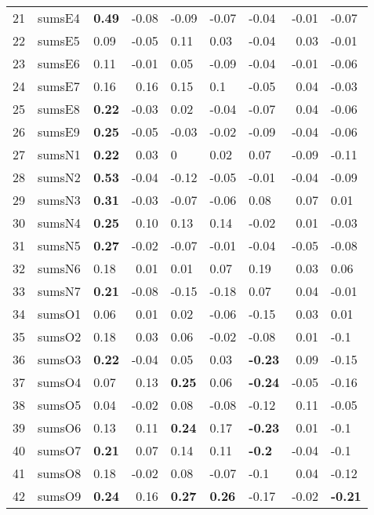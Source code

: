 \documentclass[man]{apa6}
\theoremstyle{definition}
\theoremstyle{definition}
\theoremstyle{definition}
\theoremstyle{remark}
\begin{document}
\begin{table}[ht]
\begin{tabular}{rllrlllrl}
   21 & sumsE4 & \textbf{0.49} & -0.08 & -0.09 & -0.07 & -0.04 & -0.01 & -0.07 \\ 
   22 & sumsE5 & 0.09 & -0.05 & 0.11 & 0.03 & -0.04 & 0.03 & -0.01 \\ 
   23 & sumsE6 & 0.11 & -0.01 & 0.05 & -0.09 & -0.04 & -0.01 & -0.06 \\ 
   24 & sumsE7 & 0.16 & 0.16 & 0.15 & 0.1 & -0.05 & 0.04 & -0.03 \\ 
   25 & sumsE8 & \textbf{0.22} & -0.03 & 0.02 & -0.04 & -0.07 & 0.04 & -0.06 \\ 
   26 & sumsE9 & \textbf{0.25} & -0.05 & -0.03 & -0.02 & -0.09 & -0.04 & -0.06 \\ 
   27 & sumsN1 & \textbf{0.22} & 0.03 & 0 & 0.02 & 0.07 & -0.09 & -0.11 \\ 
   28 & sumsN2 & \textbf{0.53} & -0.04 & -0.12 & -0.05 & -0.01 & -0.04 & -0.09 \\ 
   29 & sumsN3 & \textbf{0.31} & -0.03 & -0.07 & -0.06 & 0.08 & 0.07 & 0.01 \\ 
   30 & sumsN4 & \textbf{0.25} & 0.10 & 0.13 & 0.14 & -0.02 & 0.01 & -0.03 \\ 
   31 & sumsN5 & \textbf{0.27} & -0.02 & -0.07 & -0.01 & -0.04 & -0.05 & -0.08 \\ 
   32 & sumsN6 & 0.18 & 0.01 & 0.01 & 0.07 & 0.19 & 0.03 & 0.06 \\ 
   33 & sumsN7 & \textbf{0.21} & -0.08 & -0.15 & -0.18 & 0.07 & 0.04 & -0.01 \\ 
   34 & sumsO1 & 0.06 & 0.01 & 0.02 & -0.06 & -0.15 & 0.03 & 0.01 \\ 
   35 & sumsO2 & 0.18 & 0.03 & 0.06 & -0.02 & -0.08 & 0.01 & -0.1 \\ 
   36 & sumsO3 & \textbf{0.22} & -0.04 & 0.05 & 0.03 & \textbf{-0.23} & 0.09 & -0.15 \\ 
   37 & sumsO4 & 0.07 & 0.13 & \textbf{0.25} & 0.06 & \textbf{-0.24} & -0.05 & -0.16 \\ 
   38 & sumsO5 & 0.04 & -0.02 & 0.08 & -0.08 & -0.12 & 0.11 & -0.05 \\ 
   39 & sumsO6 & 0.13 & 0.11 & \textbf{0.24} & 0.17 & \textbf{-0.23} & 0.01 & -0.1 \\ 
   40 & sumsO7 & \textbf{0.21} & 0.07 & 0.14 & 0.11 & \textbf{-0.2} & -0.04 & -0.1 \\ 
   41 & sumsO8 & 0.18 & -0.02 & 0.08 & -0.07 & -0.1 & 0.04 & -0.12 \\ 
   42 & sumsO9 & \textbf{0.24} & 0.16 & \textbf{0.27} & \textbf{0.26} & -0.17 & -0.02 & \textbf{-0.21} \\ 
   \hline
\end{tabular}
\endgroup
\end{table}
\end{document}
